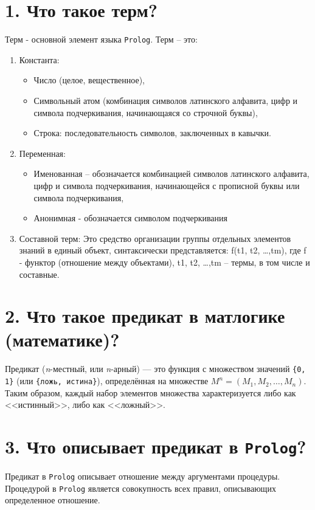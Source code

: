 \section*{1. Что такое терм?}

Терм - основной элемент языка \texttt{Prolog}. Терм – это:
\begin{enumerate}
	\item Константа: 
	\begin{itemize}
		\item Число (целое, вещественное),
		\item Символьный атом (комбинация символов латинского алфавита, цифр и символа подчеркивания, начинающаяся со строчной буквы),
		\item Строка: последовательность символов, заключенных в кавычки.
	\end{itemize}
	\item Переменная:
	\begin{itemize}
		\item Именованная – обозначается комбинацией символов латинского алфавита, цифр и символа подчеркивания, начинающейся с прописной буквы или символа подчеркивания,
		\item Анонимная  - обозначается символом подчеркивания
	\end{itemize}
	\item Составной терм:
	Это средство организации группы отдельных элементов знаний в единый  объект,  синтаксически представляется: f(t1, t2, …,tm), где f -  функтор (отношение между объектами), t1, t2, …,tm – термы, в том  числе  и составные.
\end{enumerate}

\section*{2. Что такое предикат в матлогике (математике)?}

Предикат (\textit{n}-местный, или \textit{n}-арный) --- это функция с множеством значений \texttt{\{0, 1\}} (или \texttt{\{ложь, истина\}}), определённая на множестве $M^n = (M_1, M_2, \ldots, M_n)$. Таким образом, каждый набор элементов множества характеризуется либо как <<истинный>>, либо как <<ложный>>.

\section*{3. Что описывает предикат в \texttt{Prolog}?}

Предикат в \texttt{Prolog} описывает отношение между аргументами процедуры. Процедурой в \texttt{Prolog} является совокупность всех правил, описывающих определенное отношение.

